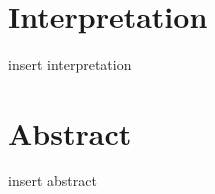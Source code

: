 \documentclass[11pt]{article}
\begin{document}
    \begin{center}
    \end{center}
    { \hspace*{\fill} \\}
    
    \hypertarget{interpretation}{%
\section{Interpretation}\label{interpretation}}

    insert interpretation

    \hypertarget{abstract}{%
\section{Abstract}\label{abstract}}

    insert abstract


    
    
    
    
\end{document}
